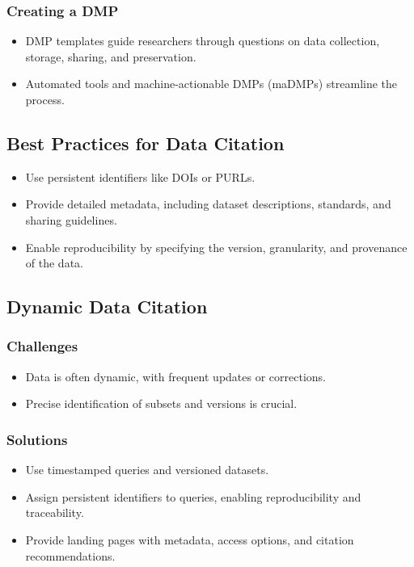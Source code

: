 \subsubsection{Creating a DMP}
\begin{itemize}
    \item DMP templates guide researchers through questions on data collection, storage, sharing, and preservation.
    \item Automated tools and machine-actionable DMPs (maDMPs) streamline the process.
\end{itemize}

\subsection{Best Practices for Data Citation}
\begin{itemize}
    \item Use persistent identifiers like DOIs or PURLs.
    \item Provide detailed metadata, including dataset descriptions, standards, and sharing guidelines.
    \item Enable reproducibility by specifying the version, granularity, and provenance of the data.
\end{itemize}

\subsection{Dynamic Data Citation}
\subsubsection{Challenges}
\begin{itemize}
    \item Data is often dynamic, with frequent updates or corrections.
    \item Precise identification of subsets and versions is crucial.
\end{itemize}

\subsubsection{Solutions}
\begin{itemize}
    \item Use timestamped queries and versioned datasets.
    \item Assign persistent identifiers to queries, enabling reproducibility and traceability.
    \item Provide landing pages with metadata, access options, and citation recommendations.
\end{itemize}

